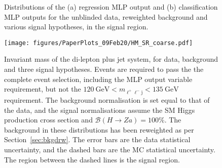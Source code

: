 \documentclass[NOTE, atlasdraft=true, texlive=2017, UKenglish]{\ATLASLATEXPATH atlasdoc}
\begin{document}


\begin{figure}[!htbp]
  \centering
  \caption{Distributions of the (a) regression MLP output and (b) classification MLP outputs for the unblinded data, reweighted background and various signal hypotheses, in the signal region.}
  \label{fig:observedsrplots}
\end{figure}


\begin{figure}[!htbp]
  \centering
  \texttt{[image: figures/PaperPlots\_09Feb20/HM\_SR\_coarse.pdf]}
  \caption{Invariant mass of the di-lepton plus jet system, for data, background and three signal hypotheses. Events are required to pass the the complete event selection, including the MLP output variable requirement, but not the $120~\text{GeV}<m_{\ell^+\ell^-\text{j}}<135~\text{GeV}$ requirement. The background normalisation is set equal to that of the data, and the signal normalisations assume the SM Higgs production cross section and $\mathcal{B}(H\to Za)=100\%$. The background in these distributions has been reweighted as per Section~\ref{sec:bkgdrw}. The error bars are the data statistical uncertainty, and the dashed bars are the MC statistical uncertainty. The region between the dashed lines is the signal region.}
  \label{fig:observedmh}
\end{figure}



\clearpage
\end{document}

